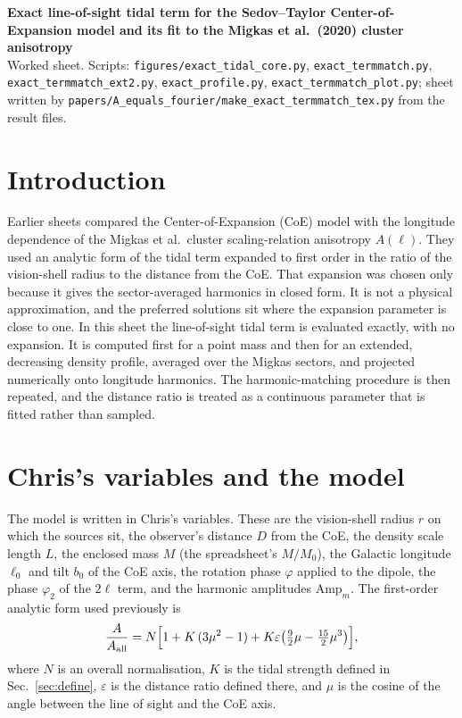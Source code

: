 \documentclass[10pt]{article}
\begin{document}
\begin{center}
{\Large\textbf{Exact line-of-sight tidal term for the Sedov--Taylor Center-of-Expansion model and its fit to the Migkas et al.\ (2020) cluster anisotropy}}\\[6pt]
{\small Worked sheet. Scripts: \texttt{figures/exact\_tidal\_core.py}, \texttt{exact\_termmatch.py}, \texttt{exact\_termmatch\_ext2.py}, \texttt{exact\_profile.py}, \texttt{exact\_termmatch\_plot.py}; sheet written by \texttt{papers/A\_equals\_fourier/make\_exact\_termmatch\_tex.py} from the result files.}
\end{center}

\section{Introduction}
Earlier sheets compared the Center-of-Expansion (CoE) model with the longitude dependence of the Migkas et al.\ cluster scaling-relation anisotropy $A(\ell)$. They used an analytic form of the tidal term expanded to first order in the ratio of the vision-shell radius to the distance from the CoE. That expansion was chosen only because it gives the sector-averaged harmonics in closed form. It is not a physical approximation, and the preferred solutions sit where the expansion parameter is close to one. In this sheet the line-of-sight tidal term is evaluated exactly, with no expansion. It is computed first for a point mass and then for an extended, decreasing density profile, averaged over the Migkas sectors, and projected numerically onto longitude harmonics. The harmonic-matching procedure is then repeated, and the distance ratio is treated as a continuous parameter that is fitted rather than sampled.

\section{Chris's variables and the model}
The model is written in Chris's variables. These are the vision-shell radius $r$ on which the sources sit, the observer's distance $D$ from the CoE, the density scale length $L$, the enclosed mass $M$ (the spreadsheet's $M/M_0$), the Galactic longitude $\ell_0$ and tilt $b_0$ of the CoE axis, the rotation phase $\varphi$ applied to the dipole, the phase $\varphi_2$ of the $2\ell$ term, and the harmonic amplitudes $\mathrm{Amp}_m$. The first-order analytic form used previously is
\begin{equation}
\frac{A}{A_{\rm all}}=N\Big[1+K\,(3\mu^2-1)+K\varepsilon\big(\tfrac92\mu-\tfrac{15}{2}\mu^3\big)\Big],
\label{eq:series}
\end{equation}
where $N$ is an overall normalisation, $K$ is the tidal strength defined in Sec.~\ref{sec:define}, $\varepsilon$ is the distance ratio defined there, and $\mu$ is the cosine of the angle between the line of sight and the CoE axis.
\end{document}
